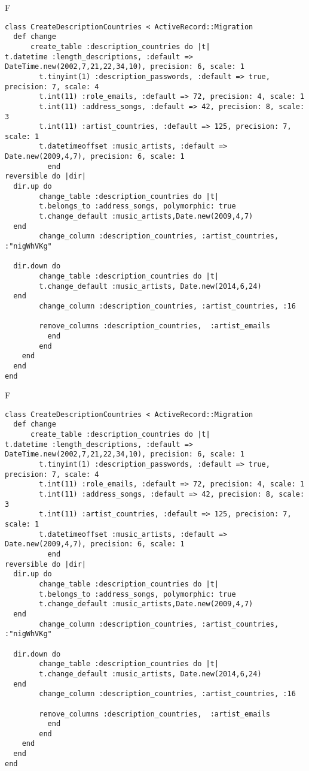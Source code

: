 F
\begin{verbatim}
class CreateDescriptionCountries < ActiveRecord::Migration
  def change
	  create_table :description_countries do |t|
t.datetime :length_descriptions, :default => DateTime.new(2002,7,21,22,34,10), precision: 6, scale: 1
		t.tinyint(1) :description_passwords, :default => true, precision: 7, scale: 4
		t.int(11) :role_emails, :default => 72, precision: 4, scale: 1
		t.int(11) :address_songs, :default => 42, precision: 8, scale: 3
		t.int(11) :artist_countries, :default => 125, precision: 7, scale: 1
		t.datetimeoffset :music_artists, :default => Date.new(2009,4,7), precision: 6, scale: 1
		  end
reversible do |dir|
  dir.up do
		change_table :description_countries do |t|
		t.belongs_to :address_songs, polymorphic: true
 		t.change_default :music_artists,Date.new(2009,4,7)
  end
 		change_column :description_countries, :artist_countries, :"nigWhVKg"
   
  dir.down do
		change_table :description_countries do |t|
		t.change_default :music_artists, Date.new(2014,6,24)
  end
 		change_column :description_countries, :artist_countries, :16
   
		remove_columns :description_countries,  :artist_emails 
	      end
	    end
    end 
  end
end

\end{verbatim}

F
\begin{verbatim}
class CreateDescriptionCountries < ActiveRecord::Migration
  def change
	  create_table :description_countries do |t|
t.datetime :length_descriptions, :default => DateTime.new(2002,7,21,22,34,10), precision: 6, scale: 1
		t.tinyint(1) :description_passwords, :default => true, precision: 7, scale: 4
		t.int(11) :role_emails, :default => 72, precision: 4, scale: 1
		t.int(11) :address_songs, :default => 42, precision: 8, scale: 3
		t.int(11) :artist_countries, :default => 125, precision: 7, scale: 1
		t.datetimeoffset :music_artists, :default => Date.new(2009,4,7), precision: 6, scale: 1
		  end
reversible do |dir|
  dir.up do
		change_table :description_countries do |t|
		t.belongs_to :address_songs, polymorphic: true
 		t.change_default :music_artists,Date.new(2009,4,7)
  end
 		change_column :description_countries, :artist_countries, :"nigWhVKg"
   
  dir.down do
		change_table :description_countries do |t|
		t.change_default :music_artists, Date.new(2014,6,24)
  end
 		change_column :description_countries, :artist_countries, :16
   
		remove_columns :description_countries,  :artist_emails 
	      end
	    end
    end 
  end
end

\end{verbatim}

